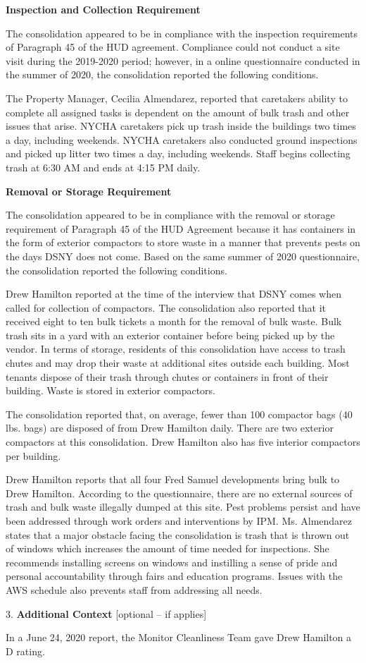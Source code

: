 

\textbf{Inspection and Collection Requirement}

The consolidation appeared to be in compliance with the inspection requirements of Paragraph 45 of the HUD agreement. Compliance could not conduct a site visit during the 2019-2020 period; however, in a online questionnaire conducted in the summer of 2020, the consolidation reported the following conditions.

The Property Manager, Cecilia Almendarez, reported that caretakers ability to complete all assigned tasks is dependent on the amount of bulk trash and other issues that arise. NYCHA caretakers pick up trash inside the buildings two times a day, including weekends. NYCHA caretakers also conducted ground inspections and picked up litter two times a day, including weekends. Staff begins collecting trash at 6:30 AM and ends at 4:15 PM daily. 

\textbf{Removal or Storage Requirement}

The consolidation appeared to be in compliance with the  removal or storage requirement of Paragraph  45 of the HUD Agreement because it has containers in the form of exterior compactors to store waste in a manner that prevents pests on the days DSNY does not come. Based on the same summer of  2020 questionnaire, the consolidation reported the following conditions.

Drew Hamilton reported at the time of the interview that DSNY comes when called for collection of compactors. The consolidation also reported that it received eight to ten bulk tickets a month for the removal of bulk waste. Bulk trash sits in a yard with an exterior container before being picked up by the vendor. In terms of storage, residents of this consolidation have access to trash chutes and may drop their waste at additional sites outside each building. Most tenants dispose of their trash through chutes or containers in front of their building. Waste is stored in exterior compactors. 

The consolidation reported that, on average, fewer than 100 compactor bags (40 lbs. bags) are disposed of from Drew Hamilton daily. There are two exterior compactors at this consolidation. Drew Hamilton also has five interior compactors per building.

Drew Hamilton reports that all four Fred Samuel developments bring bulk to Drew Hamilton. According to the questionnaire, there are no external sources of trash and bulk waste illegally dumped at this site. Pest problems persist and have been addressed through work orders and interventions by IPM. Ms. Almendarez states that a major obstacle facing the consolidation is trash that is thrown out of windows which increases the amount of time needed  for inspections. She recommends installing screens on windows and instilling a sense of pride and personal accountability through fairs and education programs. Issues with the AWS schedule also prevents staff from addressing all needs. 

3. \textbf{Additional Context} [optional -- if applies]

In a June 24, 2020 report, the Monitor Cleanliness Team gave Drew Hamilton a D rating. 